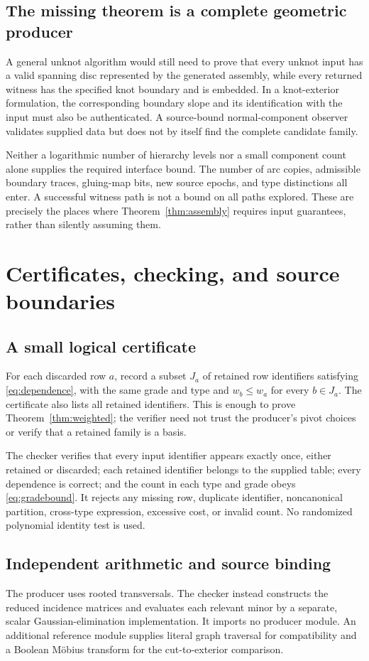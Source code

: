 \documentclass[11pt,a4paper]{article}
\theoremstyle{remark}\newtheorem{remark}[theorem]{Remark}
\begin{document}
\subsection{The missing theorem is a complete geometric producer}
A general unknot algorithm would still need to prove that every unknot input has a valid spanning disc represented by the generated assembly, while every returned witness has the specified knot boundary and is embedded. In a knot-exterior formulation, the corresponding boundary slope and its identification with the input must also be authenticated. A source-bound normal-component observer validates supplied data but does not by itself find the complete candidate family.

Neither a logarithmic number of hierarchy levels nor a small component count alone supplies the required interface bound. The number of arc copies, admissible boundary traces, gluing-map bits, new source epochs, and type distinctions all enter. A successful witness path is not a bound on all paths explored. These are precisely the places where Theorem~\ref{thm:assembly} requires input guarantees, rather than silently assuming them.

\section{Certificates, checking, and source boundaries}\label{sec:cert}
\subsection{A small logical certificate}
For each discarded row $a$, record a subset $J_a$ of retained row identifiers satisfying \eqref{eq:dependence}, with the same grade and type and $w_b\le w_a$ for every $b\in J_a$. The certificate also lists all retained identifiers. This is enough to prove Theorem~\ref{thm:weighted}; the verifier need not trust the producer's pivot choices or verify that a retained family is a basis.

The checker verifies that every input identifier appears exactly once, either retained or discarded; each retained identifier belongs to the supplied table; every dependence is correct; and the count in each type and grade obeys \eqref{eq:gradebound}. It rejects any missing row, duplicate identifier, noncanonical partition, cross-type expression, excessive cost, or invalid count. No randomized polynomial identity test is used.

\subsection{Independent arithmetic and source binding}
The producer uses rooted transversals. The checker instead constructs the reduced incidence matrices and evaluates each relevant minor by a separate, scalar Gaussian-elimination implementation. It imports no producer module. An additional reference module supplies literal graph traversal for compatibility and a Boolean M\"obius transform for the cut-to-exterior comparison.
\end{document}
